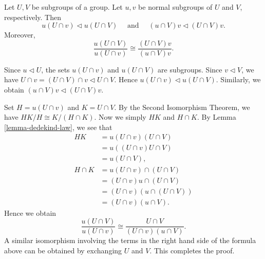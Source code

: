\begin{lemma} \label{lemma-zassenhaus}
	Let $U,V$ be subgroups of a group. Let $u,v$ be normal subgroups of $U$ and $V$, respectively. Then 
	\begin{equation*}
		u(U\cap v)\lhd u(U\cap V) \quad \text{ and }\quad (u\cap V)v \lhd (U\cap V)v.
	\end{equation*}
	Moreover, 
	\begin{equation*}
		\frac{u(U\cap V)}{u(U\cap v)} \cong \frac{(U\cap V)v}{(u\cap V)v}.
	\end{equation*}
\end{lemma}
\begin{sketch}
	\begin{comment}
		
	We recall some properties and results of normal subgroups that will be used latter.
	
 	Let $G$ be a group. Let $N$ be a normal subgroup and let $K$ be subgroups of $G$. Then
 	\begin{enumerate}[(i)]
 		\item $N\cap K$ is a normal subgroup of $K$.
 		\item $NK=KN$ is a subgroup of $G$.
 		\item If $H$ is a normal subgroup of $K$, then $NH$ is a normal subgroup of $NK$.
 	\end{enumerate}
	\end{comment}
	
	Since $u \lhd U$, the sets $u(U\cap v)$ and $u(U\cap V)$ are subgroups. Since $v\lhd V$, we have $U\cap v = (U\cap V) \cap v\lhd U\cap V$. Hence $u(U\cap v)\lhd u(U\cap V)$. Similarly, we obtain $(u\cap V)v \lhd (U\cap V)v$.
	
Set $H = u(U\cap v)$ and $K = U \cap V$. By the Second Isomorphism Theorem, we have $HK/H \cong  K/(H\cap K)$. Now we simply $HK$ and $H\cap K$. By Lemma \ref{lemma-dedekind-law}, we see that
\begin{align*}
	HK &= u(U\cap v) (U \cap V)
	\\
	&= u((U\cap v)U \cap V)
	\\
	&= u(U\cap V),
	\\
	H \cap K  &= u(U\cap v) \cap (U \cap V)\\
	&=  (U\cap v)u \cap (U \cap V)
	\\
	&= (U\cap v)(u \cap (U\cap V))
	\\
	&= (U \cap v)(u \cap V).
\end{align*}
Hence we obtain
\begin{equation*}
	\frac{u(U\cap V)}{u(U\cap v)}\cong \frac{U\cap V}{(U\cap v)(u\cap V)}.
\end{equation*}
A similar isomorphism involving the terms in the right hand side of the formula above can be obtained by exchanging $U$ and $V$. This completes the proof.
\end{sketch}
